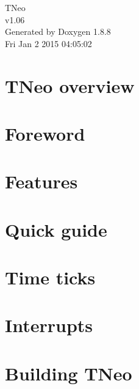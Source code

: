 \documentclass[twoside]{book}
\newcommand{\+}{\discretionary{\mbox{\scriptsize$\hookleftarrow$}}{}{}}
\newcommand{\clearemptydoublepage}{%
  \newpage{\pagestyle{empty}\cleardoublepage}%
}
\begin{document}
\hypersetup{pageanchor=false,
             bookmarks=true,
             bookmarksnumbered=true,
             pdfencoding=unicode
            }
\begin{titlepage}
\vspace*{7cm}
\begin{center}%
{\Large T\+Neo \\[1ex]\large v1.\+06 }\\
\vspace*{1cm}
{\large Generated by Doxygen 1.8.8}\\
\vspace*{0.5cm}
{\small Fri Jan 2 2015 04:05:02}\\
\end{center}
\end{titlepage}
\clearemptydoublepage
\tableofcontents
\clearemptydoublepage
{}
\hypersetup{pageanchor=true}

\chapter{T\+Neo overview}
\label{index}\hypertarget{index}{}
\chapter{Foreword}
\label{foreword}
\hypertarget{foreword}{}

\chapter{Features}
\label{features}
\hypertarget{features}{}

\chapter{Quick guide}
\label{quick_guide}
\hypertarget{quick_guide}{}

\chapter{Time ticks}
\label{time_ticks}
\hypertarget{time_ticks}{}

\chapter{Interrupts}
\label{interrupts}
\hypertarget{interrupts}{}

\chapter{Building T\+Neo}
\label{building}
\hypertarget{building}{}

\end{document}
